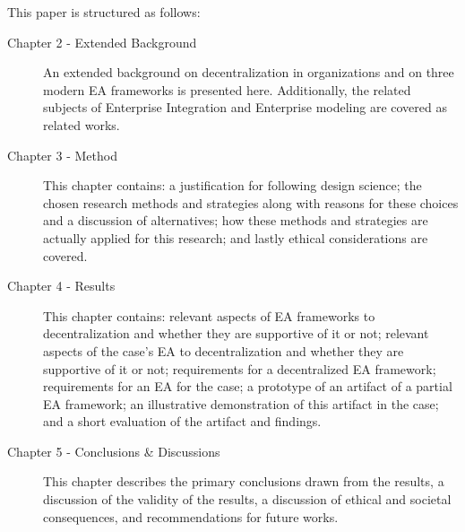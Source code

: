 This paper is structured as follows:
\begin{description}
  \item[Chapter 2 - Extended Background] An extended background on decentralization in organizations and on three modern EA frameworks is presented here. Additionally, the related subjects of Enterprise Integration and Enterprise modeling are covered as related works. 
  \item[Chapter 3 - Method] This chapter contains: a justification for following design science; the chosen research methods and strategies along with reasons for these choices and a discussion of alternatives; how these methods and strategies are actually applied for this research; and lastly ethical considerations are covered. 
  \item[Chapter 4 - Results] This chapter contains: relevant aspects of EA frameworks to decentralization and whether they are supportive of it or not; relevant aspects of the case's EA to decentralization and whether they are supportive of it or not; requirements for a decentralized EA framework; requirements for an EA for the case; a prototype of an artifact of a partial EA framework; an illustrative demonstration of this artifact in the case; and a short evaluation of the artifact and findings. 
  \item[Chapter 5 - Conclusions \& Discussions] This chapter describes the primary conclusions drawn from the results, a discussion of the validity of the results, a discussion of ethical and societal consequences, and recommendations for future works. 
\end{description}